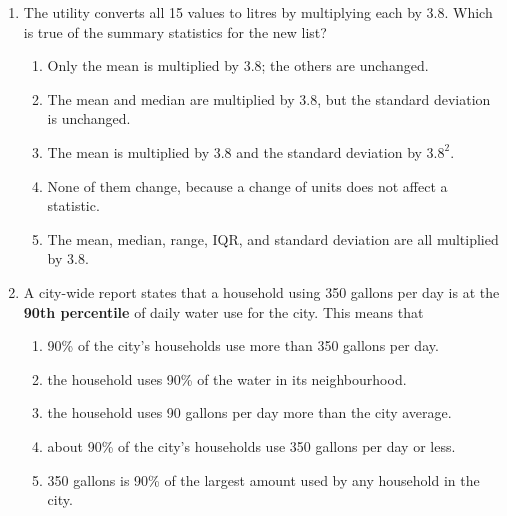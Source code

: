 \documentclass[12pt]{article}
\begin{document}
\begin{enumerate}[leftmargin=1.9em, itemsep=0.10in]
  \item The utility converts all 15 values to litres by multiplying each by 3.8. Which is
        true of the summary statistics for the new list?
        \begin{enumerate}[label=\textbf{(\Alph*)}, leftmargin=2.2em, itemsep=2pt]
          \item Only the mean is multiplied by 3.8; the others are unchanged.
          \item The mean and median are multiplied by 3.8, but the standard deviation is unchanged.
          \item The mean is multiplied by 3.8 and the standard deviation by $3.8^2$.
          \item None of them change, because a change of units does not affect a statistic.
          \item The mean, median, range, IQR, and standard deviation are all multiplied by 3.8.
                \par\rule{0pt}{0.25in}\hfill{}
        \end{enumerate}

  \item A city-wide report states that a household using 350 gallons per day is at the
        \textbf{90th percentile} of daily water use for the city. This means that
        \begin{enumerate}[label=\textbf{(\Alph*)}, leftmargin=2.2em, itemsep=2pt]
          \item 90\% of the city's households use more than 350 gallons per day.
          \item the household uses 90\% of the water in its neighbourhood.
          \item the household uses 90 gallons per day more than the city average.
          \item about 90\% of the city's households use 350 gallons per day or less.
          \item 350 gallons is 90\% of the largest amount used by any household in the city.
                \par\rule{0pt}{0.25in}\hfill{}
        \end{enumerate}

\end{enumerate}

\vspace{0.10in}
\end{document}
